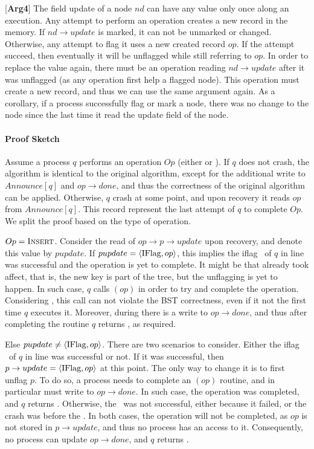 \newcommand{\argNodeUpdate}{arg4}
[\textbf{Arg4}] The field update of a node $nd$ can have any value only once along an execution. Any attempt to perform an operation creates a new record in the memory. If $nd\rightarrow update$ is marked, it can not be unmarked or changed. Otherwise, any attempt to flag it uses a new created record $op$. If the attempt succeed, then eventually it will be unflagged while still referring to $op$. In order to replace the value again, there must be an operation reading $nd\rightarrow update$ after it was unflagged (as any operation first help a flagged node). This operation must create a new record, and thus we can use the same argument again. As a corollary, if a process successfully flag or mark a node, there was no change to the node since the last time it read the update field of the node.

\paragraph{Proof Sketch}
Assume a process $q$ performs an operation $Op$ (either  or ). If $q$ does not crash, the algorithm is identical to the original algorithm, except for the additional write to $Announce[q]$ and $op\rightarrow done$, and thus the correctness of the original algorithm can be applied. Otherwise, $q$ crash at some point, and upon recovery it reads $op$ from $Announce[q]$. This record represent the last attempt of $q$ to complete $Op$. We split the proof based on the type of operation.

$Op = \mbox{\sc Insert}$. Consider the read of $op\rightarrow p\rightarrow update$ upon recovery, and denote this value by $pupdate$. If $pupdate = \langle \mbox{IFlag}, op \rangle$, this implies the iflag \CASB\ of $q$ in line  was successful and the operation is yet to complete. It might be that  already took affect, that is, the new key is part of the tree, but the unflagging is yet to happen. In such case, $q$ calls $(op)$ in order to try and complete the operation. Considering \argAnonymous, this call can not violate the BST correctness, even if it not the first time $q$ executes it. Moreover, during  there is a write to $op\rightarrow done$, and thus after completing the routine $q$ returns \TRUE, as required.

Else $pupdate \neq \langle \mbox{IFlag}, op \rangle$. There are two scenarios to consider. Either the iflag \CASB\ of $q$ in line  was successful or not. If it was successful, then $p\rightarrow update = \langle \mbox{IFlag}, op \rangle$ at this point. The only way to change it is to first unflag $p$. To do so, a process needs to complete an $(op)$ routine, and in particular must write to $op\rightarrow done$. In such case, the  operation was completed, and $q$ returns \TRUE. Otherwise, the \CASB\ was not successful, either because it failed, or the crash was before the \CASB. In both cases, the  operation will not be completed, as $op$ is not stored in $p\rightarrow update$, and thus no process has an access to it. Consequently, no process can update $op\rightarrow done$, and $q$ returns \FAIL.


